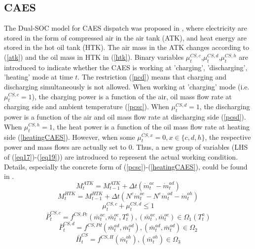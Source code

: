 \documentclass[journal,twoside,web]{ieeecolor}
\begin{document}
\subsection{CAES}
The Dual-SOC model for CAES dispatch was proposed in \cite{AACAES}, where electricity are stored in the form of compressed air in the air tank (ATK), and heat energy are stored in the hot oil tank (HTK).
The air mass in the ATK changes according to (\ref{atk}) and the oil mass in HTK in (\ref{htk}).
Binary variables $\mu^{CS,c}_t$,$\mu^{CS,d}_t$,$\mu^{CS,h}_t$ are introduced to indicate whether the CAES is working at 'charging', 'discharging', 'heating' mode at time $t$.
The restriction (\ref{ncd}) means that charging and discharging simultaneously is not allowed.
When working at 'charging' mode (i.e. $\mu^{CS,c}_t=1$), the charging power is a function of the air, oil mass flow rate at charging side and ambient temperature (\ref{pcsc}).
When $\mu^{CS,d}_t=1$, the discharging power is a function of the air and oil mass flow rate at discharging side (\ref{pcsd}).
When $\mu^{CS,h}_t=1$, the heat power is a function of the oil mass flow rate at heating side (\ref{heatingCAES}).
However, when some $\mu^{CS,x}_t=0, x \in \{c,d,h\}$, the respective power and mass flows are actually set to 0.
Thus, a new group of variables (LHS of (\ref{eq17})-(\ref{eq19})) are introduced to represent the actual working condition.
Details, especially the concrete form of (\ref{pcsc})-(\ref{heatingCAES}), could be found in \cite{AACAES}.
\begin{equation}\label{atk}
	M^{ATK}_t = M^{ATK}_{t-1} + \Delta t(\dot m^{ac}_t-\dot m^{ad}_t)
\end{equation}
\begin{equation}\label{htk}
	M^{HTK}_t = M^{HTK}_{t-1} + \Delta t(N^c\dot m^{oc}_t-N^e\dot m^{od}_t-\dot m^{oh}_t)
\end{equation}
\begin{equation}\label{ncd}
	\mu^{CS,c}_t+\mu^{CS,d}_t \le 1
\end{equation}
\begin{equation}\label{pcsc}
    \bar P^{CS,c}_t = f^{CS,Pc}(\bar m^{ac}_t,\bar m^{oc}_t,T^{a}_t),(\bar m^{ac}_t,\bar m^{oc}_t)\in \Omega_1(T^{a}_t)
\end{equation}
\begin{equation}\label{pcsd}
    \bar P^{CS,d}_t = f^{CS,Pd}(\bar m^{ad}_t,\bar m^{od}_t),(\bar m^{ad}_t,\bar m^{od}_t)\in \Omega_2
\end{equation}
\begin{equation}\label{heatingCAES}
    \bar H^{CS}_t = f^{CS,H}(\bar m^{oh}_t),(\bar m^{oh}_t)\in \Omega_3
\end{equation}
\end{document}
